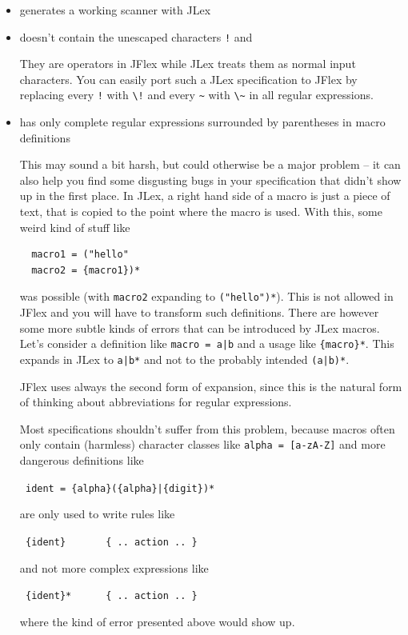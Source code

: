 \documentclass[11pt]{scrartcl}
\begin{document}
\begin{itemize}
\item
  generates a working scanner with JLex

\item 
  doesn't contain the unescaped characters \texttt{!} and \texttt{}

  They are operators in JFlex while JLex treats them as normal
  input characters. You can easily port such a JLex specification
  to JFlex by replacing every \texttt{!} with \verb+\!+ and every
  \verb+~+ with \verb+\~+ in all regular expressions.

\item
  has only complete regular expressions surrounded by parentheses in
  macro definitions
  
  This may sound a bit harsh, but could otherwise be a major problem
  -- it can also help you find some disgusting bugs in your
  specification that didn't show up in the first place. In JLex, a
  right hand side of a macro is just a piece of text, that is copied
  to the point where the macro is used. With this, some weird kind of
  stuff like
  \begin{verbatim}
  macro1 = ("hello"
  macro2 = {macro1})*
  \end{verbatim}  
  was possible (with \texttt{macro2} expanding to \verb+("hello")*+).  This
  is not allowed in JFlex and you will have to transform such
  definitions. There are however some more subtle kinds of errors that
  can be introduced by JLex macros. Let's consider a definition like
  \verb+macro = a|b+  and a usage like \verb+{macro}*+.
  This expands in JLex to \verb+a|b*+ and not to the probably intended
  \verb+(a|b)*+.

  JFlex uses always the second form of expansion, since this is the natural
  form of thinking about abbreviations for regular expressions.

  Most specifications shouldn't suffer from this problem, because
  macros often only contain (harmless) character classes like
  \texttt{alpha = [a-zA-Z]} and more dangerous definitions like

  \verb+ ident = {alpha}({alpha}|{digit})*+

  are only used to write rules like

  \verb+ {ident}       { .. action .. }+

  and not more complex expressions like

  \verb+ {ident}*      { .. action .. }+

  where the kind of error presented above would show up.
\end{itemize}
\end{document}
